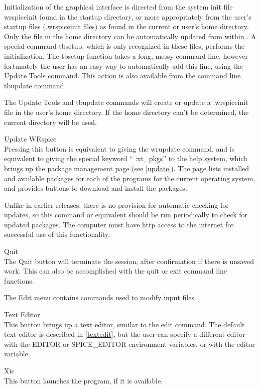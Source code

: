 \begin{description}
Initialization of the graphical interface is directed from the system
init file {\vt wrspiceinit} found in the startup directory, or more
appropriately from the user's startup files ({\vt .wrspiceinit} files)
as found in the current or user's home directory.  Only the file in
the home directory can be automatically updated from within
{\WRspice}.  A special command {\vt tbsetup}, which is only recognized
in these files, performs the initialization.  The {\vt tbsetup}
function takes a long, messy command line, however fortunately the
user has an easy way to automatically add this line, using the
{\cb Update Tools} command.  This action is also available from the
command line {\cb tbupdate} command.

The {\cb Update Tools} and {\cb tbupdate} commands will create or
update a {\vt .wrspiceinit} file in the user's home directory.  If the
home directory can't be determined, the current directory will be
used.

\item{\cb Update WRspice}\\
Pressing this button is equivalent to giving the {\cb wrupdate}
command, and is equivalent to giving the special keyword ``{\vt
:xt\_pkgs}'' to the help system, which brings up the {\XicTools}
package management page (see \ref{update}).  The page lists
installed and available packages for each of the {\XicTools} programs
for the current operating system, and provides buttons to download and
install the packages.

Unlike in earlier {\WRspice} releases, there is no provision for
automatic checking for updates, so this command or equivalent should
be run periodically to check for updated packages.  The computer must
have http access to the internet for successful use of this
functionality.

\item{\cb Quit}\\
The {\cb Quit} button will terminate the {\WRspice} session, after
confirmation if there is unsaved work.  This can also be accomplished
with the {\cb quit} or {\cb exit} command line functions.
\end{description}

The {\cb Edit} menu contains commands used to modify input files.

\begin{description}
\item{\cb Text Editor}\\
This button brings up a text editor, similar to the {\cb edit}
command.  The default text editor is described in \ref{textedit},
but the user can specify a different editor with the {\et EDITOR} or
{\et SPICE\_EDITOR} environment variables, or with the {\et editor}
variable.

\item{\cb Xic}\\
This button launches the {\Xic} program, if it is available.
\end{description}

